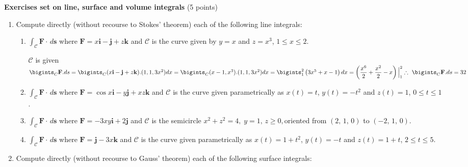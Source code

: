 \documentclass[fleqn]{article}
\begin{document}
  \textbf{Exercises set on line, surface and volume integrals} (5 points)
  \begin{enumerate}

    \item Compute directly (without recourse to Stokes' theorem) each of the following line integrals:
    
      \begin{enumerate}
        \item $\int_{\mathcal{C}}\mathbf{F\cdot }\, d\mathbf{s}$ where $\mathbf{F}=x \mathbf{i}-\mathbf{j}+z\mathbf{k}$ and $\mathcal{C}$ is the curve given by $y=x$ and $z=x^{3}$, $1\leq x\leq 2$.

          \textcolor{hwColor}{
            $\mathcal{C}$ is given \\
            $
              \bigints_C \mathbf{F}.ds=\bigints_C (x \mathbf{i}-\mathbf{j}+z\mathbf{k}).(1,1,3x^2)dx=\bigints_C (x-1,x^3).(1,1,3x^2)dx \\
              \\
              =\bigints_{1}^{2} \left(3x^5+x-1\right)dx=\left(\dfrac{x^6}{2}+\dfrac{x^2}{2}-x\right)\Big|_{1}^{2} \\
              \\
              \therefore ~ \bigints_C \mathbf{F}.ds=32
            $
          }
        
        \item $\int_{\mathcal{C}}\mathbf{F\cdot }\, d\mathbf{s}$ where $\mathbf{F}=\cos x\mathbf{i}-y\mathbf{j}+xz\mathbf{k}$ and $\mathcal{C}$ is the curve given parametrically as $x\left( t\right) =t$, $y\left(t\right) =-t^{2}$ and $z\left( t\right) =1$, $0\leq t\leq 1$.
        
        \item $\int_{\mathcal{C}}\mathbf{F\cdot }\, d\mathbf{s}$ where $\mathbf{F}=-3xy \mathbf{i}+2\mathbf{j}$ and $\mathcal{C}$ is the semicircle $x^{2}+z^{2}=4,\;y=1,\,z\geq 0,$oriented from $\left( 2,\,1,\,0\right) $ to $\left( -2,\,1,\,0\right) .$
        
        \item $\int_{\mathcal{C}}\mathbf{F\cdot }\, d\mathbf{s}$ where $\mathbf{F}= \mathbf{j}-3x\mathbf{k}$ and $\mathcal{C}$ is the curve given parametrically as $x\left( t\right) =1+t^{2}$, $y\left( t\right) =-t$ and $ z\left( t\right) =1+t$, $2\leq t\leq 5$.
      \end{enumerate}
    
    
    \item Compute directly (without recourse to Gauss' theorem) each of the following surface integrals:
    

\end{enumerate}
\end{document}
